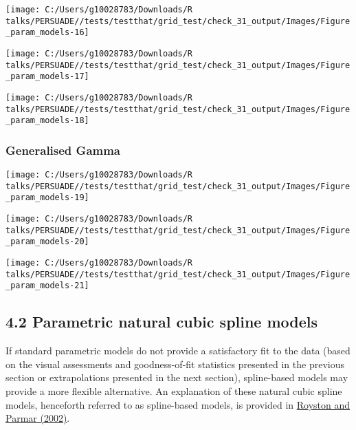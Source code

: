 \documentclass[
]{article}
\begin{document}
\begin{flushleft}\texttt{[image: C:/Users/g10028783/Downloads/R talks/PERSUADE//tests/testthat/grid\_test/check\_31\_output/Images/Figure\_param\_models-16]} \end{flushleft}

\begin{flushleft}\texttt{[image: C:/Users/g10028783/Downloads/R talks/PERSUADE//tests/testthat/grid\_test/check\_31\_output/Images/Figure\_param\_models-17]} \end{flushleft}

\begin{flushleft}\texttt{[image: C:/Users/g10028783/Downloads/R talks/PERSUADE//tests/testthat/grid\_test/check\_31\_output/Images/Figure\_param\_models-18]} \end{flushleft}

\clearpage

\subsubsection{Generalised Gamma}\label{generalised-gamma}

\begin{flushleft}\texttt{[image: C:/Users/g10028783/Downloads/R talks/PERSUADE//tests/testthat/grid\_test/check\_31\_output/Images/Figure\_param\_models-19]} \end{flushleft}

\begin{flushleft}\texttt{[image: C:/Users/g10028783/Downloads/R talks/PERSUADE//tests/testthat/grid\_test/check\_31\_output/Images/Figure\_param\_models-20]} \end{flushleft}

\begin{flushleft}\texttt{[image: C:/Users/g10028783/Downloads/R talks/PERSUADE//tests/testthat/grid\_test/check\_31\_output/Images/Figure\_param\_models-21]} \end{flushleft}

\clearpage

\subsection{4.2 Parametric natural cubic spline
models}\label{parametric-natural-cubic-spline-models}

If standard parametric models do not provide a satisfactory fit to the
data (based on the visual assessments and goodness-of-fit statistics
presented in the previous section or extrapolations presented in the
next section), spline-based models may provide a more flexible
alternative. An explanation of these natural cubic spline models,
henceforth referred to as spline-based models, is provided in
\href{https://doi.org/10.1002/sim.1203}{Royston and Parmar (2002)}.
\end{document}
